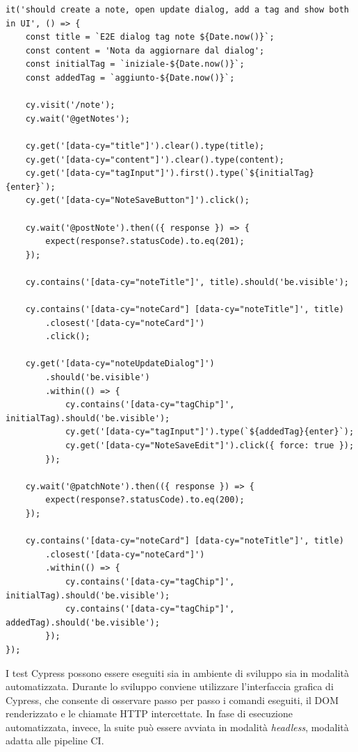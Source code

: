 \captionsetup{type=listing}
\label{lst:cypress-test}
\begin{verbatim}
it('should create a note, open update dialog, add a tag and show both in UI', () => {
	const title = `E2E dialog tag note ${Date.now()}`;
	const content = 'Nota da aggiornare dal dialog';
	const initialTag = `iniziale-${Date.now()}`;
	const addedTag = `aggiunto-${Date.now()}`;
	
	cy.visit('/note');
	cy.wait('@getNotes');
	
	cy.get('[data-cy="title"]').clear().type(title);
	cy.get('[data-cy="content"]').clear().type(content);
	cy.get('[data-cy="tagInput"]').first().type(`${initialTag}{enter}`);
	cy.get('[data-cy="NoteSaveButton"]').click();
	
	cy.wait('@postNote').then(({ response }) => {
		expect(response?.statusCode).to.eq(201);
	});
	
	cy.contains('[data-cy="noteTitle"]', title).should('be.visible');
	
	cy.contains('[data-cy="noteCard"] [data-cy="noteTitle"]', title)
		.closest('[data-cy="noteCard"]')
		.click();
	
	cy.get('[data-cy="noteUpdateDialog"]')
		.should('be.visible')
		.within(() => {
			cy.contains('[data-cy="tagChip"]', initialTag).should('be.visible');
			cy.get('[data-cy="tagInput"]').type(`${addedTag}{enter}`);
			cy.get('[data-cy="NoteSaveEdit"]').click({ force: true });
		});
	
	cy.wait('@patchNote').then(({ response }) => {
		expect(response?.statusCode).to.eq(200);
	});
	
	cy.contains('[data-cy="noteCard"] [data-cy="noteTitle"]', title)
		.closest('[data-cy="noteCard"]')
		.within(() => {
			cy.contains('[data-cy="tagChip"]', initialTag).should('be.visible');
			cy.contains('[data-cy="tagChip"]', addedTag).should('be.visible');
		});
});
\end{verbatim}

I test Cypress possono essere eseguiti sia in ambiente di sviluppo sia in modalità automatizzata. Durante lo sviluppo conviene utilizzare l'interfaccia grafica di Cypress, che consente di osservare passo per passo i comandi eseguiti, il DOM renderizzato e le chiamate HTTP intercettate. In fase di esecuzione automatizzata, invece, la suite può essere avviata in modalità \emph{headless}, modalità adatta alle pipeline CI.

